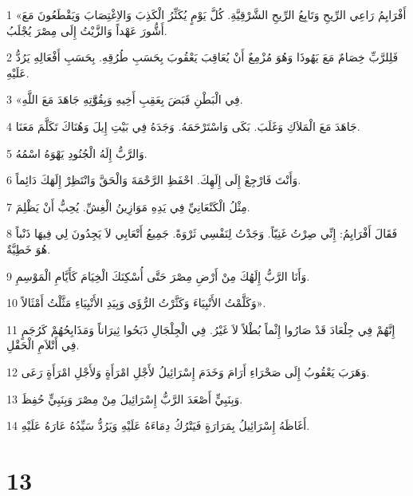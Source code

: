 \par 1 «أَفْرَايِمُ رَاعِي الرِّيحِ وَتَابِعُ الرِّيحِ الشَّرْقِيَّةِ. كُلَّ يَوْمٍ يُكَثِّرُ الْكَذِبَ وَالاِغْتِصَابَ وَيَقْطَعُونَ مَعَ أَشُّورَ عَهْداً وَالزَّيْتُ إِلَى مِصْرَ يُجْلَبُ.
\par 2 فَلِلرَّبِّ خِصَامٌ مَعَ يَهُوذَا وَهُوَ مُزْمِعٌ أَنْ يُعَاقِبَ يَعْقُوبَ بِحَسَبِ طُرُقِهِ. بِحَسَبِ أَفْعَالِهِ يَرُدُّ عَلَيْهِ.
\par 3 «فِي الْبَطْنِ قَبَضَ بِعَقِبِ أَخِيهِ وَبِقُوَّّتِهِ جَاهَدَ مَعَ اللَّهِ.
\par 4 جَاهَدَ مَعَ الْمَلاَكِ وَغَلَبَ. بَكَى وَاسْتَرْحَمَهُ. وَجَدَهُ فِي بَيْتِ إِيلَ وَهُنَاكَ تَكَلَّمَ مَعَنَا.
\par 5 وَالرَّبُّ إِلَهُ الْجُنُودِ يَهْوَهُ اسْمُهُ.
\par 6 وَأَنْتَ فَارْجِعْ إِلَى إِلَهِكَ. احْفَظِ الرَّحْمَةَ وَالْحَقَّ وَانْتَظِرْ إِلَهَكَ دَائِماً.
\par 7 مِثْلُ الْكَنْعَانِيِّ فِي يَدِهِ مَوَازِينُ الْغِشِّ. يُحِبُّ أَنْ يَظْلِمَ.
\par 8 فَقَالَ أَفْرَايِمُ: إِنِّي صِرْتُ غَنِيّاً. وَجَدْتُ لِنَفْسِي ثَرْوَةً. جَمِيعُ أَتْعَابِي لاَ يَجِدُونَ لِي فِيهَا ذَنْباً هُوَ خَطِيَّةٌ.
\par 9 وَأَنَا الرَّبُّ إِلَهُكَ مِنْ أَرْضِ مِصْرَ حَتَّى أُسْكِنَكَ الْخِيَامَ كَأَيَّامِ الْمَوْسِمِ.
\par 10 وَكَلَّمْتُ الأَنْبِيَاءَ وَكَثَّرْتُ الرُّؤَى وَبِيَدِ الأَنْبِيَاءِ مَثَّلْتُ أَمْثَالاً».
\par 11 إِنَّهُمْ فِي جِلْعَادَ قَدْ صَارُوا إِثْماً بُطْلاً لاَ غَيْرُ. فِي الْجِلْجَالِ ذَبَحُوا ثِيرَاناً وَمَذَابِحُهُمْ كَرُجَمٍ فِي أَتْلاَمِ الْحَقْلِ.
\par 12 وَهَرَبَ يَعْقُوبُ إِلَى صَحْرَاءِ أَرَامَ وَخَدَمَ إِسْرَائِيلُ لأَجْلِ امْرَأَةٍ وَلأَجْلِ امْرَأَةٍ رَعَى.
\par 13 وَبِنَبِيٍّ أَصْعَدَ الرَّبُّ إِسْرَائِيلَ مِنْ مِصْرَ وَبِنَبِيٍّ حُفِظَ.
\par 14 أَغَاظَهُ إِسْرَائِيلُ بِمَرَارَةٍ فَيَتْرُكُ دِمَاءَهُ عَلَيْهِ وَيَرُدُّ سَيِّدُهُ عَارَهُ عَلَيْهِ.

\chapter{13}

